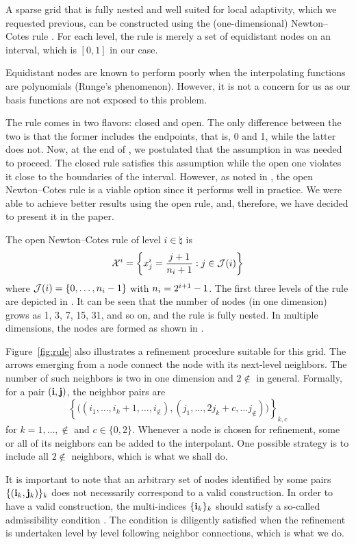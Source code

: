 A sparse grid that is fully nested and well suited for local adaptivity, which
we requested previous, can be constructed using the (one-dimensional)
Newton--Cotes rule \cite{klimke2006, ma2009}. For each level, the rule is merely
a set of equidistant nodes on an interval, which is $[0, 1]$ in our case.

\begin{remark}
Equidistant nodes are known to perform poorly when the interpolating functions
are polynomials (Runge's phenomenon). However, it is not a concern for us as our
basis functions are not exposed to this problem.
\end{remark}

The rule comes in two flavors: closed and open. The only difference between the
two is that the former includes the endpoints, that is, 0 and 1, while the
latter does not. Now, at the end of , we postulated that
the assumption in  was needed to proceed. The closed rule
satisfies this assumption while the open one violates it close to the boundaries
of the interval. However, as noted in \cite{klimke2006}, the open Newton--Cotes
rule is a viable option since it performs well in practice. We were able to
achieve better results using the open rule, and, therefore, we have decided to
present it in the paper.


The open Newton--Cotes rule of level $i \in \natural$ is
\begin{equation} \elab{newton-cotes-grid}
  \X^i = \left\{ x^i_j = \frac{j + 1}{\n_i + 1}: j \in \index(i) \right\}
\end{equation}
where $\mathcal{J}(i) = \left\{ 0, \dots, n_i - 1 \right\}$ with $n_i = 2^{i + 1} -
1$. The first three levels of the rule are depicted in . It can be
seen that the number of nodes (in one dimension) grows as 1, 3, 7, 15, 31, and
so on, and the rule is fully nested. In multiple dimensions, the nodes are
formed as shown in .

Figure~\ref{fig:rule} also illustrates a refinement procedure suitable for this
grid. The arrows emerging from a node connect the node with its next-level
neighbors. The number of such neighbors is two in one dimension and $2 \nin$ in
general. Formally, for a pair $(\mathbf{i}, \mathbf{j})$, the neighbor pairs are
\[
  \left\{ \Big( (i_1, \dots, i_k + 1, \dots, i_\nin), (j_1, \dots, 2 j_k + c, \dots j_\nin) \Big) \right\}_{k, c}
\]
for $k = 1, \dots, \nin$ and $c \in \{ 0, 2 \}$. Whenever a node is chosen for
refinement, some or all of its neighbors can be added to the interpolant. One
possible strategy is to include all $2 \nin$ neighbors, which is what we shall
do.

\begin{remark}
It is important to note that an arbitrary set of nodes identified by some pairs
$\{ (\mathbf{i}_k, \mathbf{j}_k) \}_k$ does not necessarily correspond to a valid
construction. In order to have a valid construction, the multi-indices $\{ \mathbf{i}_k
\}_k$ should satisfy a so-called admissibility condition \cite{klimke2006}. The
condition is diligently satisfied when the refinement is undertaken level by
level following neighbor connections, which is what we do.
\end{remark}
